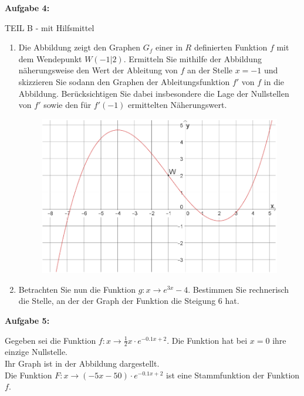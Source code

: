 \documentclass[a4paper,12pt]{article}
\newcommand{\Aufgabe}[1]{
  {
  \vspace*{0.5cm}
  \textsf{\textbf{Aufgabe #1}}
  \vspace*{0.2cm}
  
  }
}
\begin{document}
\Aufgabe{4:}
{TEIL B} - mit Hilfsmittel


\begin{enumerate}[label={\alph*)}]
  \item Die Abbildung zeigt den Graphen $G_f$  einer in $R$ definierten Funktion $f$ mit dem Wendepunkt $W(-1|2)$. Ermitteln Sie mithilfe der Abbildung näherungsweise den Wert der Ableitung von $f$  an der Stelle $x=-1$  und skizzieren Sie sodann den Graphen der Ableitungsfunktion $f'$  von $f$  in die Abbildung. Berücksichtigen Sie dabei insbesondere die Lage der Nullstellen von $f'$  sowie den für $f'(-1)$ ermittelten Näherungswert.

  \begin{figure}[H]
    \centering
    \includegraphics[width=0.8\columnwidth]{210227_funkcja.png}
  \end{figure}

\item Betrachten Sie nun die Funktion $g: x\rightarrow e^{3x}-4$. Bestimmen Sie rechnerisch die Stelle, an der der Graph der Funktion die Steigung 6 hat.
\end{enumerate}


\Aufgabe{5:}
Gegeben sei die Funktion $f: x\rightarrow \frac{1}{2}x\cdot e^{-0.1x+2}$. Die Funktion hat bei $x=0$ ihre einzige Nullstelle.\\
Ihr Graph ist in der Abbildung dargestellt.\\
Die Funktion $F:x\rightarrow (-5x-50)\cdot e^{-0.1x+2}$ ist eine Stammfunktion der Funktion $f$.
\end{document}
